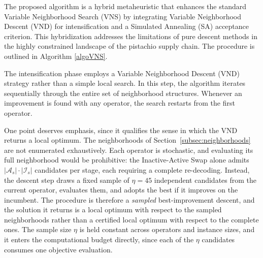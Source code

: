 \documentclass[preprint,12pt,authoryear]{elsarticle}
\begin{document}
The proposed algorithm is a hybrid metaheuristic that enhances the standard Variable Neighborhood Search (VNS) \citep{hansen2010} by integrating Variable Neighborhood Descent (VND) 
for intensification and a Simulated Annealing (SA) acceptance criterion. This hybridization addresses the limitations of pure descent methods in the highly constrained landscape of the 
pistachio supply chain. The procedure is outlined in Algorithm \ref{algoVNS}.

The intensification phase employs a Variable Neighborhood Descent (VND) strategy rather than a simple local search. In this step, the algorithm iterates sequentially through the
entire set of neighborhood structures. Whenever an improvement is found with any operator, the search restarts from the first operator.

One point deserves emphasis, since it qualifies the sense in which the VND returns a local optimum. The neighborhoods of Section~\ref{subsec:neighborhoods} are not enumerated
exhaustively. Each operator is stochastic, and evaluating its full neighborhood would be prohibitive: the Inactive-Active Swap alone admits $|\mathcal{A}_s| \cdot |\mathcal{I}_s|$
candidates per stage, each requiring a complete re-decoding. Instead, the descent step draws a fixed sample of $\eta = 45$ independent candidates from the current operator, evaluates
them, and adopts the best if it improves on the incumbent. The procedure is therefore a \emph{sampled} best-improvement descent, and the solution it returns is a local optimum with
respect to the sampled neighborhoods rather than a certified local optimum with respect to the complete ones. The sample size $\eta$ is held constant across operators and instance
sizes, and it enters the computational budget directly, since each of the $\eta$ candidates consumes one objective evaluation.

\end{document}
